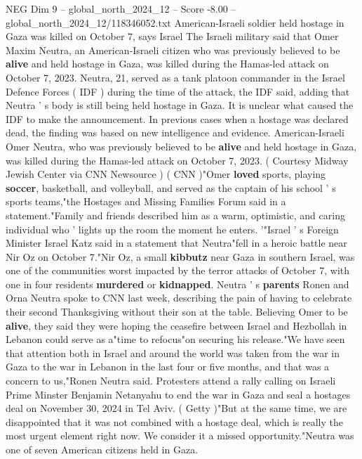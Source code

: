 \begin{textsample}{NEG Dim 9 – global\_north\_2024\_12 – Score -8.00 – global\_north\_2024\_12/118346052.txt}  \label{ex:f9_neg_120}
American-Israeli soldier held hostage in Gaza was killed on October 7, says Israel The Israeli military said that Omer Maxim Neutra, an American-Israeli citizen who was previously believed to be \textbf{alive} and held hostage in Gaza, was killed during the Hamas-led attack on October 7, 2023.
Neutra, 21, served as a tank platoon commander in the Israel Defence Forces ( IDF ) during the time of the attack, the IDF said, adding that Neutra ' s body is still being held hostage in Gaza.
It is unclear what caused the IDF to make the announcement.
In previous cases when a hostage was declared dead, the finding was based on new intelligence and evidence.
American-Israeli Omer Neutra, who was previously believed to be \textbf{alive} and held hostage in Gaza, was killed during the Hamas-led attack on October 7, 2023. ( Courtesy Midway Jewish Center via CNN Newsource ) ( CNN )"Omer \textbf{loved} sports, playing \textbf{soccer}, basketball, and volleyball, and served as the captain of his school ' s sports teams,"the Hostages and Missing Families Forum said in a statement."Family and friends described him as a warm, optimistic, and caring individual who ' lights up the room the moment he enters. '"Israel ' s Foreign Minister Israel Katz said in a statement that Neutra"fell in a heroic battle near Nir Oz on October 7."Nir Oz, a small \textbf{kibbutz} near Gaza in southern Israel, was one of the communities worst impacted by the terror attacks of October 7, with one in four residents \textbf{murdered} or \textbf{kidnapped}.
Neutra ' s \textbf{parents} Ronen and Orna Neutra spoke to CNN last week, describing the pain of having to celebrate their second Thanksgiving without their son at the table.
Believing Omer to be \textbf{alive}, they said they were hoping the ceasefire between Israel and Hezbollah in Lebanon could serve as a"time to refocus"on securing his release."We have seen that attention both in Israel and around the world was taken from the war in Gaza to the war in Lebanon in the last four or five months, and that was a concern to us,"Ronen Neutra said.
Protesters attend a rally calling on Israeli Prime Minster Benjamin Netanyahu to end the war in Gaza and seal a hostages deal on November 30, 2024 in Tel Aviv. ( Getty )"But at the same time, we are disappointed that it was not combined with a hostage deal, which is really the most urgent element right now.
We consider it a missed opportunity."Neutra was one of seven American citizens held in Gaza.

\end{textsample}
